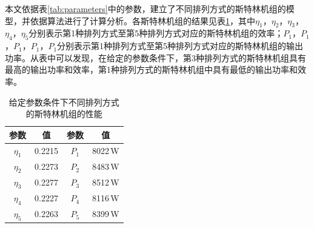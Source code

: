 本文依据表\ref{tab:parameters}中的参数，建立了不同排列方式的斯特林机组的模型，并依据算法进行了计算分析。各斯特林机组的结果见表\ref{tab:result}，其中$\eta_1$，$\eta_2$，$\eta_3$，$\eta_4$，$\eta_5$分别表示第1种排列方式至第5种排列方式对应的斯特林机组的效率；$P_1$，$P_1$，$P_1$，$P_1$，$P_1$分别表示第1种排列方式至第5种排列方式对应的斯特林机组的输出功率。从表中可以发现，在给定的参数条件下，第3种排列方式的斯特林机组具有最高的输出功率和效率，第1种排列方式的斯特林机组中具有最低的输出功率和效率。

\begin{table}[htbp]
\setlength{\abovecaptionskip}{-10pt}
	\caption{给定参数条件下不同排列方式的斯特林机组的性能}
	\begin{center}
	\begin{tabular}{cccc}
		\toprule
		参数		&	值	&	参数		&	值\\
		\midrule
		$\eta_1$	&	0.2215	&	$P_1$		&	8022\,W\\
		$\eta_2$	&	0.2273	&	$P_2$		&	8483\,W\\
		$\eta_3$	&	0.2277	&	$P_3$		&	8512\,W\\
		$\eta_4$	&	0.2227	&	$P_4$		&	8116\,W\\
		$\eta_5$	&	0.2263	&	$P_5$		&	8399\,W\\		
		\bottomrule
	\end{tabular}
	\end{center}
	\label{tab:result}
\end{table}

